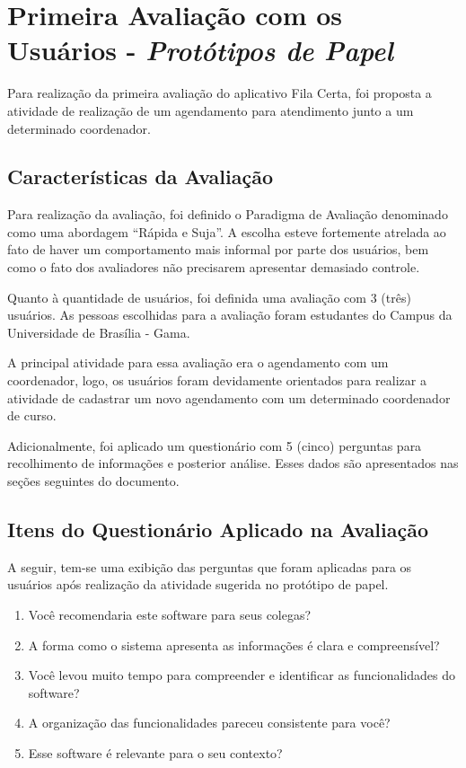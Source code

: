 	\section[Primeira Avaliação com os Usuários - Protótipos de Papel]{Primeira Avaliação com os Usuários - \emph{Protótipos de Papel}}
	\label{sec:avaliacaoPrototipos_Primeira}

		Para realização da primeira avaliação do aplicativo Fila Certa, foi proposta a atividade de realização de um agendamento para atendimento junto a um determinado coordenador.

		\subsection[Características da Avaliação]{Características da Avaliação}
		\label{sec:primeiraAvaliacao_Caracteristicas}

			Para realização da avaliação, foi definido o Paradigma de Avaliação denominado como uma abordagem “Rápida e Suja”. A escolha esteve fortemente atrelada ao fato de haver um comportamento mais informal por parte dos usuários, bem como o fato dos avaliadores não precisarem apresentar demasiado controle.

			Quanto à quantidade de usuários, foi definida uma avaliação com 3 (três) usuários. As pessoas escolhidas para a avaliação foram estudantes do Campus da Universidade de Brasília - Gama.

			A principal atividade para essa avaliação era o agendamento com um coordenador, logo, os usuários foram devidamente orientados para realizar a atividade de cadastrar um novo agendamento com um determinado coordenador de curso.

			Adicionalmente, foi aplicado um questionário com 5 (cinco) perguntas para recolhimento de informações e posterior análise. Esses dados são apresentados nas seções seguintes do documento.

		\subsection[Itens do Questionário Aplicados na Avaliação]{Itens do Questionário Aplicado na Avaliação}
		\label{sec:primeiraAvaliacao_Questionario}

			A seguir, tem-se uma exibição das perguntas que foram aplicadas para os usuários após realização da atividade sugerida no protótipo de papel.

			\begin{enumerate}
				\item{Você recomendaria este software para seus colegas?}
				\item{A forma como o sistema apresenta as informações é clara e compreensível?}
				\item{Você levou muito tempo para compreender e identificar as funcionalidades do software?}
				\item{A organização das funcionalidades pareceu consistente para você?}
				\item{Esse software é relevante para o seu contexto?}
			\end{enumerate}

